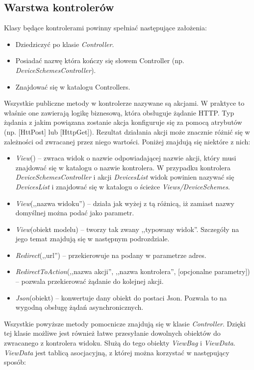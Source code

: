 \subsection{Warstwa kontrolerów}
Klasy będące kontrolerami powinny spełniać następujące założenia:
\begin{itemize}
\item Dziedziczyć po klasie \textit{Controller}. 
\item Posiadać nazwę która kończy się słowem Controller (np. \textit{DeviceSchemesController}).
\item Znajdować się w katalogu Controllers.
\end{itemize}
Wszystkie publiczne metody w kontrolerze nazywane są akcjami. W praktyce to właśnie one zawierają logikę biznesową, która obsługuje żądanie HTTP. Typ żądania z jakim powiązana zostanie akcja konfiguruje się za pomocą atrybutów (np. [HttPost] lub [HttpGet]). Rezultat działania akcji może znacznie różnić się w zależności od zwracanej przez niego wartości. Poniżej znajdują się niektóre z nich:
\begin{itemize}
\item \textit{View}() -- zwraca widok o nazwie odpowiadającej nazwie akcji, który musi znajdować się w katalogu o nazwie kontrolera. W przypadku kontrolera \textit{DeviceSchemesController} i akcji \textit{DevicesList} widok powinien nazywać się \textit{DevicesList} i znajdować się w katalogu o ścieżce \textit{Views/DeviceSchemes}.
\item \textit{View}(,,nazwa widoku'') -- działa jak wyżej z tą różnicą, iż zamiast nazwy domyślnej można podać jako parametr.
\item \textit{View}(obiekt modelu) -- tworzy tak zwany ,,typowany widok''. Szczegóły na jego temat znajdują się w następnym podrozdziale.
\item \textit{Redirect}(,,url'') -- przekierowuje na podany w parametrze adres.
\item \textit{RedirectToAction}(,,nazwa akcji'', ,,nazwa kontrolera'', [opcjonalne parametry]) -- pozwala przekierować żądanie do kolejnej akcji.
\item \textit{Json}(obiekt) -- konwertuje dany obiekt do postaci Json. Pozwala to na wygodną obsługę żądań asynchronicznych.
\end{itemize}
Wszystkie powyższe metody pomocnicze znajdują się w klasie \textit{Controller}. Dzięki tej klasie możliwe jest również łatwe przesyłanie dowolnych obiektów do zwracanego z kontrolera widoku. Służą do tego obiekty \textit{ViewBag} i \textit{ViewData}. \textit{ViewData} jest tablicą asocjacyjną, z której można korzystać w następujący sposób:

